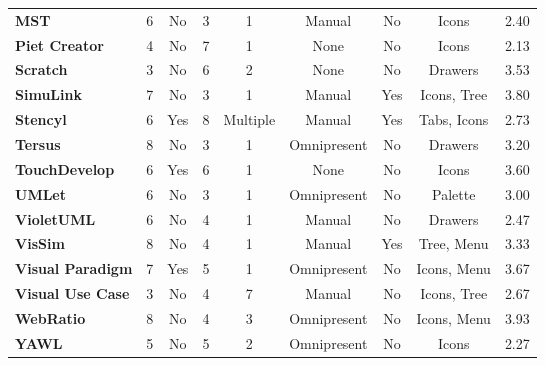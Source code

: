 \begin{table*}
{\begin{tabular}{l|cccccccc}
      \textbf{MST}    & 6	& No	& 3	& 1	& Manual	& No	& Icons	& 2.40			\\[1ex]
      \textbf{Piet Creator}    & 4	& No	& 7	& 1	& None	& No	& Icons	& 2.13			\\[1ex]
      \textbf{Scratch}    & 3	& No	& 6	& 2	& None	& No	& Drawers	& 3.53			\\[1ex]
      \textbf{SimuLink}    & 7	& No	& 3	& 1	& Manual	& Yes	& Icons, Tree	& 3.80			\\[1ex]
      \textbf{Stencyl}    & 6	& Yes	& 8	& Multiple	& Manual	& Yes	& Tabs, Icons	& 2.73			\\[1ex]
      \textbf{Tersus}    & 8	& No	& 3	& 1	& Omnipresent	& No	& Drawers	& 3.20			\\[1ex]
      \textbf{TouchDevelop}    & 6	& Yes	& 6	& 1	& None	& No	& Icons	& 3.60			\\[1ex]
      \textbf{UMLet}    & 6	& No	& 3	& 1	& Omnipresent	& No	& Palette	& 3.00			\\[1ex]
      \textbf{VioletUML}    & 6	& No	& 4	& 1	& Manual	& No	& Drawers	& 2.47			\\[1ex]
      \textbf{VisSim}    & 8	& No	& 4	& 1	& Manual	& Yes	& Tree, Menu	& 3.33			\\[1ex]
      \textbf{Visual Paradigm}    & 7	& Yes	& 5	& 1	& Omnipresent	& No	& Icons, Menu	& 3.67			\\[1ex]
      \textbf{Visual Use Case}    & 3	& No	& 4	& 7	& Manual	& No	& Icons, Tree	& 2.67			\\[1ex]
      \textbf{WebRatio}    & 8	& No	& 4	& 3	& Omnipresent	& No	& Icons, Menu	& 3.93			\\[1ex]
      \textbf{YAWL}    & 5	& No	& 5	& 2	& Omnipresent	& No	& Icons	& 2.27			\\[1ex]
		\end{tabular}}
	\caption{Measure of the chrome of \acp{ide}.}
	\label{tab:chrome}
\end{table*}
%
